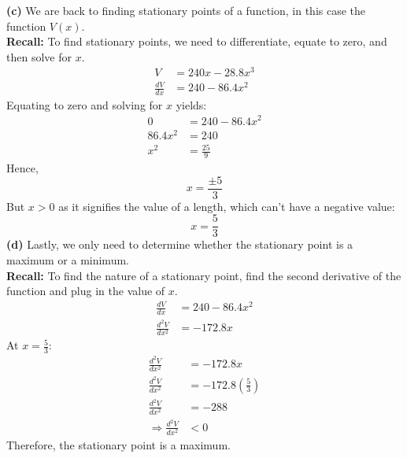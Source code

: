 \documentclass[hidelinks, a4paper, 12pt]{article}
\newcommand{\bd}{\textbf}
\newcommand{\n}{\\[\baselineskip]}
\newcommand{\thus}{\Rightarrow}
\begin{document}
            \bd{(c)} We are back to finding stationary points of a function, in this case the function $V(x)$.\n
            \bd{Recall:} To find stationary points, we need to differentiate, equate to zero, and then solve for $x$.
            \[\begin{split}
                V &= 240x - 28.8x^3\\
                \frac{dV}{dx} &= 240 - 86.4x^2
            \end{split}\]
            Equating to zero and solving for $x$ yields:
            \[\begin{split}
                0 &= 240 - 86.4x^2\\
                86.4x^2 &= 240\\
                x^2 &= \frac{25}{9}
            \end{split}\]
            Hence,
            \[x = \frac{\pm 5}{3}\]
            But $x>0$ as it signifies the value of a length, which can't have a negative value:
            \[x = \frac{5}{3}\]
            \bd{(d)} Lastly, we only need to determine whether the stationary point is a maximum or a minimum.\n
            \bd{Recall:} To find the nature of a stationary point, find the second derivative of the function and plug in the value of $x$.
            \[\begin{split}
                \frac{dV}{dx} &= 240 - 86.4x^2\\
                \frac{d^2V}{dx^2} &= -172.8x
            \end{split}\]
            At $x = \frac{5}{3}$:
            \[\begin{split}
                \frac{d^2V}{dx^2} &= -172.8x\\
                \frac{d^2V}{dx^2} &= -172.8\left(\frac{5}{3}\right)\\
                \frac{d^2V}{dx^2} &= -288\\
                \thus \frac{d^2V}{dx^2} &< 0
            \end{split}\]
            Therefore, the stationary point is a maximum.
\end{document}
